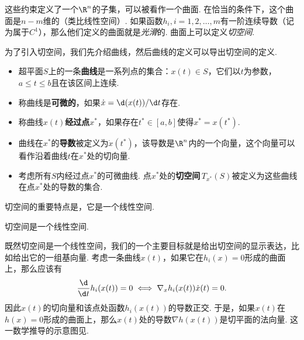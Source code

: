 这些约束定义了一个$\R^n$的子集，可以被看作一个曲面. 在恰当的条件下，这个曲面是$n-m$维的（类比线性空间）. 如果函数$h_i,i=1,2,\dots,m$有一阶连续导数（记为属于$C^1$），那么他们定义的曲面就是\emph{光滑}的. 曲面上可以定义\emph{切空间}.
    
为了引入切空间，我们先介绍曲线，然后曲线的定义可以导出切空间的定义. 
\begin{definition}[曲线与切空间]
\begin{itemize}
    \item 超平面$S$上的一条\textbf{曲线}是一系列点的集合：${x}(t)\in S$，它们以$t$为参数，$a\leq t\leq b$且在该区间上连续. 
    \item 称曲线是\textbf{可微的}，如果$\dot{{x}}=\d({x}(t))/\d t$存在. 
    \item 称曲线${x}(t)$\textbf{经过点${x^\ast}$}，如果存在$t^\ast\in[a,b]$使得${x^\ast}={x}(t^\ast)$. 
    \item 曲线在${x^\ast}$的\textbf{导数}被定义为$\dot{{x}}(t^\ast)$，该导数是$\R^n$内的一个向量，这个向量可以看作沿着曲线$t$在$x^\ast$处的切向量.
    \item 考虑所有$S$内经过点${x^\ast}$的可微曲线. 点${x^\ast}$处的\textbf{切空间}\,$T_{x^\ast}(S)$被定义为这些曲线在点${x^\ast}$处的导数的集合. 
\end{itemize}
\end{definition}

切空间的重要特点是，它是一个线性空间.
\begin{lemma}\label{lemma:tan-space}
    切空间是一个线性空间. 
\end{lemma}

既然切空间是一个线性空间，我们的一个主要目标就是给出切空间的显示表达，比如给出它的一组基向量. 考虑一条曲线$x(t)$，如果它在$h_i(x)=0$形成的曲面上，那么应该有
    \[\frac{\d}{\d t}h_i(x(t))=0\iff \nabla_x h_i(x(t))\dot{x}(t)=0.\]
因此${x}(t)$的切向量和该点处函数$h_i({x}(t))$的导数正交. 于是，如果$x(t)$在$h(x)=0$形成的曲面上，那么${x}(t)$处的导数$\nabla h(x(t))$是切平面的法向量. 这一数学推导的示意图见.


